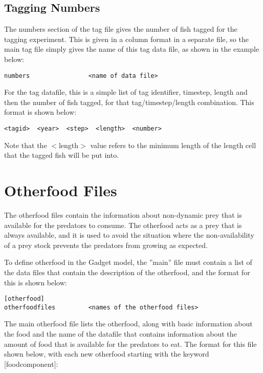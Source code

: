 \documentclass[10pt,twoside]{book}
\begin{document}
\section{Tagging Numbers}\label{sec:tagnumbers}
The numbers section of the tag file gives the number of fish tagged for the tagging experiment.  This is given in a column format in a separate file, so the main tag file simply gives the name of this tag data file, as shown in the example below:

{\small\begin{verbatim}
numbers                <name of data file>
\end{verbatim}}

For the tag datafile, this is a simple list of tag identifier, timestep, length and then the number of fish tagged, for that tag/timestep/length combination.  This format is shown below:

{\small\begin{verbatim}
<tagid>  <year>  <step>  <length>  <number>
\end{verbatim}}

Note that the $<$length$>$ value refers to the minimum length of the length cell that the tagged fish will be put into.

\chapter{Otherfood Files}\label{chap:other}
The otherfood files contain the information about non-dynamic prey that is available for the predators to consume.  The otherfood acts as a prey that is always available, and it is used to avoid the situation where the non-availability of a prey stock prevents the predators from growing as expected.

\bigskip
To define otherfood in the Gadget model, the ''main'' file must contain a list of the data files that contain the description of the otherfood, and the format for this is shown below:

{\small\begin{verbatim}
[otherfood]
otherfoodfiles         <names of the otherfood files>
\end{verbatim}}

The main otherfood file lists the otherfood, along with basic information about the food and the name of the datafile that contains information about the amount of food that is available for the predators to eat.  The format for this file shown below, with each new otherfood starting with the keyword [foodcomponent]:
\end{document}
